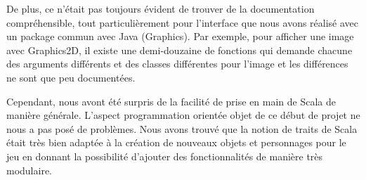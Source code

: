 \documentclass[10pt,a4paper]{article}
\begin{document}
De plus, ce n'était pas toujours évident de trouver de la documentation compréhensible, tout particulièrement pour l'interface que nous avons réalisé avec un package commun avec Java (Graphics). Par exemple, pour afficher une image avec Graphics2D, il existe une demi-douzaine de fonctions qui demande chacune des arguments différents et des classes différentes pour l'image et les différences ne sont que peu documentées.

Cependant, nous avont été surpris de la facilité de prise en main de Scala de manière générale.
L'aspect programmation orientée objet de ce début de projet ne nous a pas posé de problèmes. Nous avons trouvé que la notion de traits de Scala était très bien adaptée à la création de nouveaux objets et personnages pour le jeu en donnant la possibilité d'ajouter des fonctionnalités de manière très modulaire.



\end{document}
